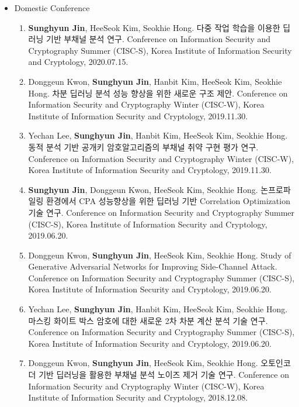 \documentclass[a4paper,20pt]{article}
\begin{document}
\begin{itemize}
    \item {Domestic Conference}
        \vspace{-6pt}
        \begin{enumerate}
            \item {\textbf{Sunghyun Jin}, HeeSeok Kim, Seokhie Hong. 다중 작업 학습을 이용한 딥러닝 기반 부채널 분석 연구. Conference on Information Security and Cryptography Summer (CISC-S), Korea Institute of Information Security and Cryptology, 2020.07.15.}
            \vspace{-2pt}
            \item {Donggeun Kwon, \textbf{Sunghyun Jin}, Hanbit Kim, HeeSeok Kim, Seokhie Hong. 차분 딥러닝 분석 성능 향상을 위한 새로운 구조 제안. Conference on Information Security and Cryptography Winter (CISC-W), Korea Institute of Information Security and Cryptology, 2019.11.30.}
            \vspace{-2pt}
            \item {Yechan Lee, \textbf{Sunghyun Jin}, Hanbit Kim, HeeSeok Kim, Seokhie Hong. 동적 분석 기반 공개키 암호알고리즘의 부채널 취약 구현 평가 연구. Conference on Information Security and Cryptography Winter (CISC-W), Korea Institute of Information Security and Cryptology, 2019.11.30.}
            \vspace{-2pt}
            \item {\textbf{Sunghyun Jin}, Donggeun Kwon, HeeSeok Kim, Seokhie Hong. 논프로파일링 환경에서 CPA 성능향상을 위한 딥러닝 기반 Correlation Optimization 기술 연구. Conference on Information Security and Cryptography Summer (CISC-S), Korea Institute of Information Security and Cryptology, 2019.06.20.}
            \vspace{-2pt}
            \item {Donggeun Kwon, \textbf{Sunghyun Jin}, HeeSeok Kim, Seokhie Hong. Study of Generative Adversarial Networks for Improving Side-Channel Attack. Conference on Information Security and Cryptography Summer (CISC-S), Korea Institute of Information Security and Cryptology, 2019.06.20.}
            \vspace{-2pt}
            \item {Yechan Lee, \textbf{Sunghyun Jin}, Hanbit Kim, HeeSeok Kim, Seokhie Hong. 마스킹 화이트 박스 암호에 대한 새로운 2차 차분 계산 분석 기술 연구. Conference on Information Security and Cryptography Summer (CISC-S), Korea Institute of Information Security and Cryptology, 2019.06.20.}
            \vspace{-2pt}
            \item {Donggeun Kwon, \textbf{Sunghyun Jin}, HeeSeok Kim, Seokhie Hong. 오토인코더 기반 딥러닝을 활용한 부채널 분석 노이즈 제거 기술 연구. Conference on Information Security and Cryptography Winter (CISC-W), Korea Institute of Information Security and Cryptology, 2018.12.08.}

\end{enumerate}
\end{itemize}
\end{document}
